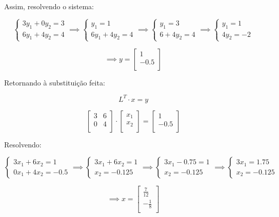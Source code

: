 \documentclass[11pt]{article}
\begin{document}
\begin{exerc}
\begin{enumerate}
Assim, resolvendo o sistema:

$$\begin{cases}
3y_1 + 0y_2 = 3\\
6y_1 + 4y_2 = 4
\end{cases}
\implies
\begin{cases}
y_1 = 1\\
6y_1 + 4y_2 = 4
\end{cases}
\implies
\begin{cases}
y_1 = 3\\
6 + 4y_2 = 4
\end{cases}
\implies
\begin{cases}
y_1 = 1\\
4y_2 = -2
\end{cases}
$$

$$
\implies
y = 
\begin{bmatrix}
	1\\
	-0.5\\
\end{bmatrix}
$$

Retornando à substituição feita:

$$L^T \cdot x = y$$

$$
\begin{bmatrix}
	3 & 6\\
	0 & 4\\
\end{bmatrix}
\cdot
\begin{bmatrix}
	x_1\\
	x_2\\
\end{bmatrix}
=
\begin{bmatrix}
	1\\
	-0.5\\
\end{bmatrix}
$$

Resolvendo:

$$
\begin{cases}
3x_1 + 6x_2 = 1\\
0x_1 + 4x_2 = -0.5
\end{cases}
\implies
\begin{cases}
3x_1 + 6x_2 = 1\\
x_2 = -0.125
\end{cases}
\implies
\begin{cases}
3x_1 - 0.75 = 1\\
x_2 = -0.125
\end{cases}
\implies
\begin{cases}
3x_1 = 1.75\\
x_2 = -0.125
\end{cases}
$$

$$
\implies
x = 
\begin{bmatrix}
	\frac{7}{12}\\
	-\frac{1}{8}\\
\end{bmatrix}
$$

\end{enumerate}
\end{exerc}
\end{document}

